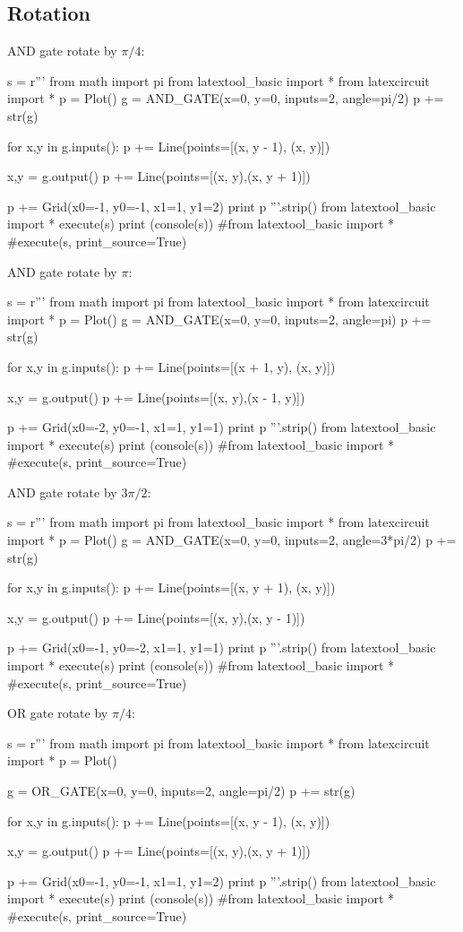 \newpage
\subsection{Rotation}
AND gate rotate by $\pi/4$:
\begin{python}
s = r'''
from math import pi
from latextool_basic import *
from latexcircuit import *
p = Plot()
g = AND_GATE(x=0, y=0, inputs=2, angle=pi/2)
p += str(g)

for x,y in g.inputs():
    p += Line(points=[(x, y - 1), (x, y)])

x,y = g.output()
p += Line(points=[(x, y),(x, y + 1)])

p += Grid(x0=-1, y0=-1, x1=1, y1=2)
print p
'''.strip()
from latextool_basic import *
execute(s)
print (console(s))
#from latextool_basic import *
#execute(s, print_source=True)
\end{python}

\newpage
AND gate rotate by $\pi$:
\begin{python}
s = r'''
from math import pi
from latextool_basic import *
from latexcircuit import *
p = Plot()
g = AND_GATE(x=0, y=0, inputs=2, angle=pi)
p += str(g)

for x,y in g.inputs():
    p += Line(points=[(x + 1, y), (x, y)])

x,y = g.output()
p += Line(points=[(x, y),(x - 1, y)])

p += Grid(x0=-2, y0=-1, x1=1, y1=1)
print p
'''.strip()
from latextool_basic import *
execute(s)
print (console(s))
#from latextool_basic import *
#execute(s, print_source=True)
\end{python}

\newpage
AND gate rotate by $3\pi/2$:
\begin{python}
s = r'''
from math import pi
from latextool_basic import *
from latexcircuit import *
p = Plot()
g = AND_GATE(x=0, y=0, inputs=2, angle=3*pi/2)
p += str(g)

for x,y in g.inputs():
    p += Line(points=[(x, y + 1), (x, y)])

x,y = g.output()
p += Line(points=[(x, y),(x, y - 1)])

p += Grid(x0=-1, y0=-2, x1=1, y1=1)
print p
'''.strip()
from latextool_basic import *
execute(s)
print (console(s))
#from latextool_basic import *
#execute(s, print_source=True)
\end{python}


\newpage
OR gate rotate by $\pi/4$:
\begin{python}
s = r'''
from math import pi
from latextool_basic import *
from latexcircuit import *
p = Plot()

g = OR_GATE(x=0, y=0, inputs=2, angle=pi/2)
p += str(g)

for x,y in g.inputs():
    p += Line(points=[(x, y - 1), (x, y)])

x,y = g.output()
p += Line(points=[(x, y),(x, y + 1)])

p += Grid(x0=-1, y0=-1, x1=1, y1=2)
print p
'''.strip()
from latextool_basic import *
execute(s)
print (console(s))
#from latextool_basic import *
#execute(s, print_source=True)
\end{python}

